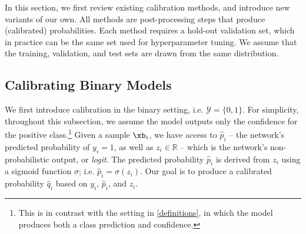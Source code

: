 \setlength{\abovedisplayskip}{4pt}
\setlength{\belowdisplayskip}{4pt}
\setlength{\textfloatsep}{4pt}

In this section, we first review existing calibration methods, and introduce new variants of our own.
All methods are post-processing steps that produce (calibrated) probabilities.
Each method requires a hold-out validation set, which in practice can be the same set used for hyperparameter tuning.
We assume that the training, validation, and test sets are drawn from the same distribution.

\subsection{Calibrating Binary Models}
\label{binary_calibration}

We first introduce calibration in the binary setting, i.e. $\mathcal{Y}=\{0,1\}$.
For simplicity, throughout this subsection, we assume the model outputs only the confidence for the positive class.\footnote{
  This is in contrast with the setting in \autoref{definitions}, in which the model produces both a class prediction and confidence.
}
Given a sample $\xb_i$, we have access to $\hat p_i$ -- the network's predicted probability of $y_i = 1$, as well as $z_i \in \mathbb{R}$ -- which is the network's non-probabilistic output, or \emph{logit}. The predicted probability $\hat p_i$ is derived from $z_i$ using a sigmoid function $\sigma$; i.e.
$\hat p_i = \sigma(z_i)$. Our goal is to produce a calibrated probability $\hat q_i$ based on $y_i$, $\hat p_i$, and $z_i$.

